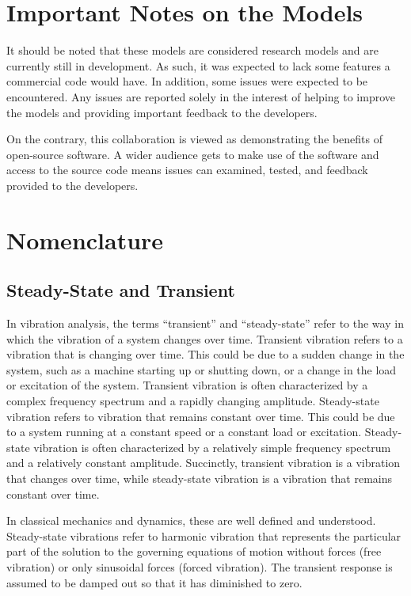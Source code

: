 \section{Important Notes on the Models}
It should be noted that these models are considered research models and are currently still in development.  As such, it was expected to lack some features a commercial code would have.  In addition, some issues were expected to be encountered.  Any issues are reported solely in the interest of helping to improve the models and providing important feedback to the developers.  

On the contrary, this collaboration is viewed as demonstrating the benefits of open-source software.  A wider audience gets to make use of the software and access to the source code means issues can examined, tested, and feedback provided to the developers.

\section{Nomenclature}
\subsection{Steady-State and Transient}
In vibration analysis, the terms ``transient'' and ``steady-state'' refer to the way in which the vibration of a system changes over time.  Transient vibration refers to a vibration that is changing over time. This could be due to a sudden change in the system, such as a machine starting up or shutting down, or a change in the load or excitation of the system.  Transient vibration is often characterized by a complex frequency spectrum and a rapidly changing amplitude.  Steady-state vibration refers to vibration that remains constant over time.  This could be due to a system running at a constant speed or a constant load or excitation.  Steady-state vibration is often characterized by a relatively simple frequency spectrum and a relatively constant amplitude.  Succinctly, transient vibration is a vibration that changes over time, while steady-state vibration is a vibration that remains constant over time.

In classical mechanics and dynamics, these are well defined and understood.  Steady-state vibrations refer to harmonic vibration that represents the particular part of the solution to the governing equations of motion without forces (free vibration) or only sinusoidal forces (forced vibration).  The transient response is assumed to be damped out so that it has diminished to zero.

